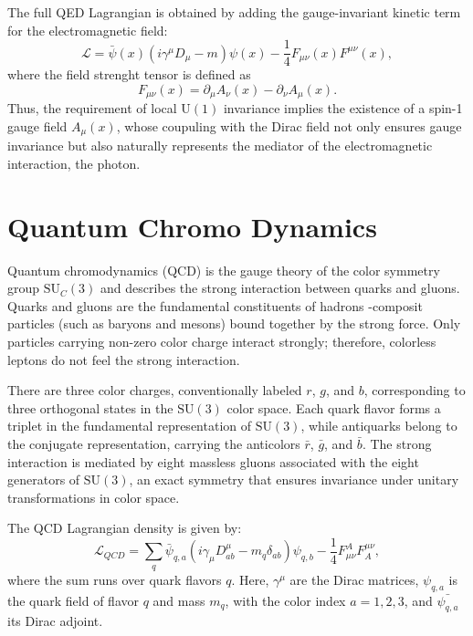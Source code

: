 The full QED Lagrangian is obtained by adding the gauge-invariant kinetic term for the electromagnetic field:
\begin{equation}
\mathcal{L}=\bar{\psi}(x)(i\gamma^\mu D_\mu -m)\psi(x)-\frac{1}{4}F_{\mu\nu}(x)F^{\mu\nu}(x),
\end{equation}
where the field strenght tensor is defined as
\begin{equation}
F_{\mu\nu}(x)=\partial_\mu A_\nu(x)-\partial_\nu A_\mu(x).
\end{equation}
Thus, the requirement of local $\mathrm{U}(1)$ invariance implies the existence of a spin-1 gauge field $A_\mu(x)$, whose coupuling with the Dirac field not only ensures gauge invariance but also naturally represents the mediator of the electromagnetic interaction, the photon.

\section{Quantum Chromo Dynamics}
\label{sec:qcd}

Quantum chromodynamics (QCD) is the gauge theory of the color symmetry group $\mathrm{SU}_C(3)$ and describes the strong interaction between quarks and gluons. Quarks and gluons are the fundamental constituents of hadrons -composit particles (such as baryons and mesons) bound together by the strong force. Only particles carrying non-zero color charge interact strongly; therefore, colorless leptons do not feel the strong interaction.

There are three color charges, conventionally labeled $r$, $g$, and $b$, corresponding to three orthogonal states in the $\mathrm{SU}(3)$ color space. Each quark flavor forms a triplet in the fundamental representation of $\mathrm{SU}(3)$, while antiquarks belong to the conjugate representation, carrying the anticolors $\bar{r}$, $\bar{g}$, and $\bar{b}$. The strong interaction is mediated by eight massless gluons associated with the eight generators of $\mathrm{SU}(3)$, an exact symmetry that ensures invariance under unitary transformations in color space.

The QCD Lagrangian density is given by:
\begin{equation}
\mathcal{L}_{QCD}=\sum_q \bar{\psi}_{q,a} (i\gamma_\mu D^\mu_{ab} -m_q \delta_{ab})\psi_{q,b}-\frac{1}{4}F_{\mu\nu}^A F^{\mu\nu}_A,
\end{equation}
where the sum runs over quark flavors $q$. Here, $\gamma^\mu$ are the Dirac matrices, $\psi_{q,a}$ is the quark field of flavor $q$ and mass $m_q$, with the color index $a=1,2,3$, and $\bar{\psi_{q,a}}$ its Dirac adjoint.

